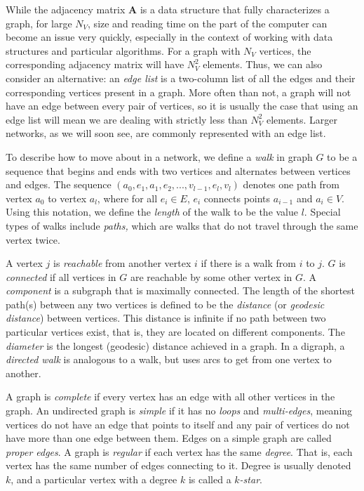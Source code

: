 \documentclass[12pt,twoside]{amherstthesis}
\begin{document}
  While the adjacency matrix \(\textbf{A}\) is a data structure that fully
  characterizes a graph, for large \(N_{V}\), size and reading time on the
  part of the computer can become an issue very quickly, especially in the
  context of working with data structures and particular algorithms. For a
  graph with \(N_{V}\) vertices, the corresponding adjacency matrix will
  have \(N_{V}^{2}\) elements. Thus, we can also consider an alternative:
  an \emph{edge list} is a two-column list of all the edges and their
  corresponding vertices present in a graph. More often than not, a graph
  will not have an edge between every pair of vertices, so it is usually
  the case that using an edge list will mean we are dealing with strictly
  less than \(N_{V}^{2}\) elements. Larger networks, as we will soon see,
  are commonly represented with an edge list.
  
  To describe how to move about in a network, we define a \emph{walk} in
  graph \(G\) to be a sequence that begins and ends with two vertices and
  alternates between vertices and edges. The sequence
  \((a_0, e_1, a_1, e_2, ..., v_{l-1}, e_l, v_l)\) denotes one path from
  vertex \(a_0\) to vertex \(a_l\), where for all \(e_i \in E\), \(e_i\)
  connects points \(a_{i-1}\) and \(a_{i} \in V\). Using this notation, we
  define the \emph{length} of the walk to be the value \(l\). Special
  types of walks include \emph{paths,} which are walks that do not travel
  through the same vertex twice.
  
  A vertex \(j\) is \emph{reachable} from another vertex \(i\) if there is
  a walk from \(i\) to \(j\). \(G\) is \emph{connected} if all vertices in
  \(G\) are reachable by some other vertex in \(G\). A \emph{component} is
  a subgraph that is maximally connected. The length of the shortest
  path(s) between any two vertices is defined to be the \emph{distance}
  (or \emph{geodesic distance}) between vertices. This distance is
  infinite if no path between two particular vertices exist, that is, they
  are located on different components. The \emph{diameter} is the longest
  (geodesic) distance achieved in a graph. In a digraph, a \emph{directed
  walk} is analogous to a walk, but uses arcs to get from one vertex to
  another.
  
  A graph is \emph{complete} if every vertex has an edge with all other
  vertices in the graph. An undirected graph is \emph{simple} if it has no
  \emph{loops} and \emph{multi-edges}, meaning vertices do not have an
  edge that points to itself and any pair of vertices do not have more
  than one edge between them. Edges on a simple graph are called
  \emph{proper edges}. A graph is \emph{regular} if each vertex has the
  same \emph{degree}. That is, each vertex has the same number of edges
  connecting to it. Degree is usually denoted \(k\), and a particular
  vertex with a degree \(k\) is called a \emph{\(k\)-star}.
  
\end{document}
